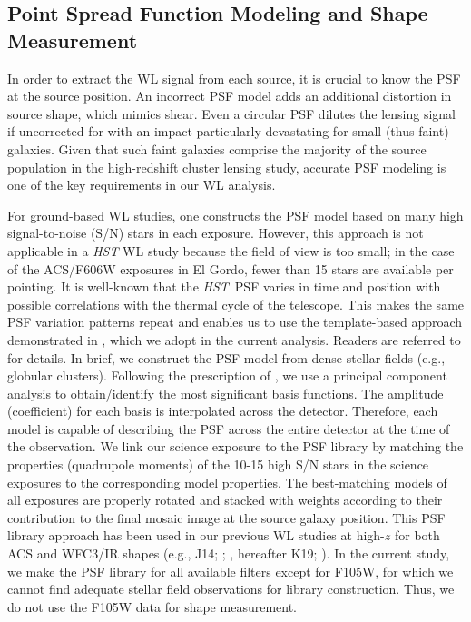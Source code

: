 \documentclass[twocolumn]{aastex631}
\newcommand{\elgordo}{El Gordo}
\newcommand{\HST}{{\it HST}}
\begin{document}
\subsection{Point Spread Function Modeling and Shape Measurement} \label{section_PSF_shape}
In order to extract the WL signal from each source, it is crucial to know the PSF at the source position. 
An incorrect PSF model adds an additional distortion in source shape, which mimics shear. Even a circular PSF dilutes the lensing signal if uncorrected for with an impact particularly devastating for small (thus faint) galaxies. 
Given that such faint galaxies comprise the majority of the source population in the high-redshift cluster lensing study, accurate PSF modeling is one of the key requirements in our WL analysis.


For ground-based WL studies, one constructs the PSF model based on many high signal-to-noise (S/N) stars in each exposure.
However, this approach is not applicable in a {\it HST} WL study because the field of view is too small; in the case of the ACS/F606W exposures in \elgordo, fewer than 15 stars are available per pointing. 
It is well-known that the \HST~PSF varies in time and position with possible correlations with the thermal cycle of the telescope. This makes the same PSF variation patterns repeat and enables us to use the template-based approach demonstrated in \cite{Jee2007a}, which we adopt in the current analysis. 
Readers are referred to \cite{Jee2007a} for details. 
In brief, we construct the PSF model from dense stellar fields (e.g., globular clusters). Following the prescription of \cite{Jee2007a}, we use a principal component analysis to obtain/identify the most significant basis functions. The amplitude (coefficient) for each basis is interpolated across the detector. 
Therefore, each model is capable of describing the PSF across the entire detector at the time of the observation. 
We link our science exposure to the PSF library by matching the properties (quadrupole moments) of the 10-15 high S/N stars in the science exposures to the corresponding model properties. 
The best-matching models of all exposures are properly rotated and stacked with weights according to their contribution to the final mosaic image at the source galaxy position. 
This PSF library approach has been used in our previous WL studies at high-$z$ for both ACS and WFC3/IR shapes (e.g., J14; \citealt{Jee2017}; \citealt{Kim2019}, hereafter K19; \citealt{Finner2020}). 
In the current study, we make the PSF library for all available filters except for F105W, for which we cannot find adequate stellar field observations for library construction. Thus, we do not use the F105W data for shape measurement.
\end{document}
